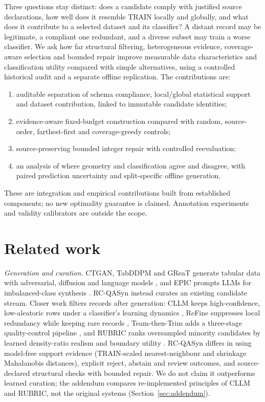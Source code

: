 Three questions stay distinct: does a candidate comply with justified source declarations, how well does it resemble TRAIN locally and globally, and what does it contribute to a selected dataset and its classifier? A distant record may be legitimate, a compliant one redundant, and a diverse subset may train a worse classifier. We ask how far structural filtering, heterogeneous evidence, coverage-aware selection and bounded repair improve measurable data characteristics and classification utility compared with simple alternatives, using a controlled historical audit and a separate offline replication. The contributions are:
\begin{enumerate}
\item auditable separation of schema compliance, local/global statistical support and dataset contribution, linked to immutable candidate identities;
\item evidence-aware fixed-budget construction compared with random, source-order, farthest-first and coverage-greedy controls;
\item source-preserving bounded integer repair with controlled reevaluation;
\item an analysis of where geometry and classification agree and disagree, with paired prediction uncertainty and split-specific offline generation.
\end{enumerate}
These are integration and empirical contributions built from established components; no new optimality guarantee is claimed. Annotation experiments and validity calibrators are outside the scope.

\section{Related work}\label{sec:related}
\textit{Generation and curation.} CTGAN, TabDDPM and GReaT generate tabular data with adversarial, diffusion and language models \cite{xu2019ctgan,kotelnikov2023tabddpm,borisov2023great}, and EPIC prompts LLMs for imbalanced-class synthesis \cite{kim2024epic}. RC-QASyn instead curates an existing candidate stream. Closer work filters records after generation: CLLM keeps high-confidence, low-aleatoric rows under a classifier's learning dynamics \cite{seedat2024cllm}, ReFine suppresses local redundancy while keeping rare records \cite{jiang2025refine}, Team-then-Trim adds a three-stage quality-control pipeline \cite{zhang2026t2}, and RUBRIC ranks oversampled minority candidates by learned density-ratio realism and boundary utility \cite{yu2026rubric}. RC-QASyn differs in using model-free support evidence (TRAIN-scaled nearest-neighbour and shrinkage Mahalanobis distances), explicit reject, abstain and review outcomes, and source-declared structural checks with bounded repair. We do not claim it outperforms learned curation; the addendum compares re-implemented principles of CLLM and RUBRIC, not the original systems (Section~\ref{sec:addendum}).

